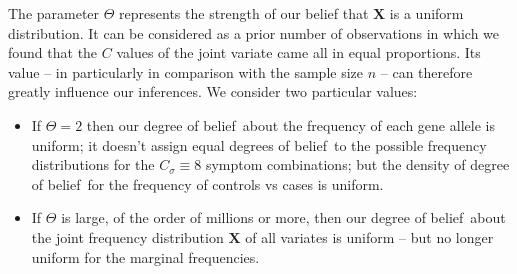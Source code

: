 \documentclass[\ifafour a4paper,12pt,\else a5paper,10pt,\fi%
onecolumn,oneside,article,%
british%
]{memoir}
\makeatletter
\theoremstyle{remark}
\theoremstyle{innote}
\def\sum{\DOTSI\sumop\slimits@}
\def\prod{\DOTSI\prodop\slimits@}
\newcommand*{\delt}{\deltaup}%
\newcommand*{\di}{\mathrm{d}}%
\newcommand*{\pf}{\mathrm{p}}%
\renewcommand*{\|}{\mathpunct{|}}
\newcommand*{\tprod}{\mathop{\textstyle\prod}\nolimits}
\newcommand*{\tsum}{\mathop{\textstyle\sum}\nolimits}
\newcommand*{\dob}{degree of belief}
\newcommand*{\dobs}{degrees of belief}
\newcommand*{\ysum}{\tsum}
\newcommand*{\yprod}{\tprod}
\newcommand*{\yFs}{\bm{S}}
\newcommand*{\yF}{\bm{X}}
\newcommand*{\yCs}{C_{\sigma}}
\newcommand*{\yIo}{I_{0}}
\newcommand*{\yA}{\varTheta}
\makeatother
\begin{document}
The parameter $\yA$ represents the strength of our belief that $\yF$ is a
uniform distribution. It can be considered as a prior number of
observations in which we found that the $C$ values of the joint variate
came all in equal proportions. Its value -- in particularly in comparison
with the sample size $n$ -- can therefore greatly influence
our inferences. We consider two particular values:
\begin{itemize}[label=--]
\item If $\yA=2$ then our \dob\ about the frequency of each gene allele is
  uniform; it doesn't assign equal \dobs\ to the possible frequency
  distributions for the $\yCs\equiv 8$ symptom combinations; %
  but the density of \dob\ for the frequency of controls vs cases is
  uniform.
\item If $\yA$ is large, of the order of millions or more, then our \dob\
  about the joint frequency distribution $\yF$ of all variates is uniform
  -- but no longer uniform for the marginal frequencies.
\end{itemize}


\end{document}
